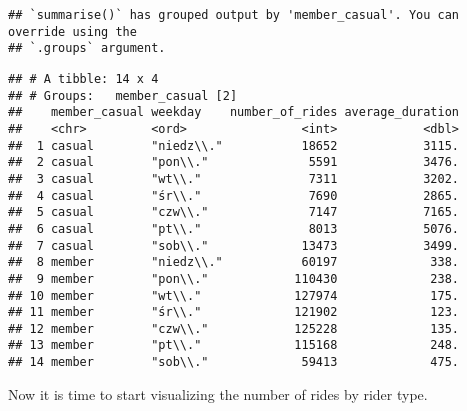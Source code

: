 \documentclass[
]{article}
\begin{document}
\begin{verbatim}
## `summarise()` has grouped output by 'member_casual'. You can override using the
## `.groups` argument.
\end{verbatim}

\begin{verbatim}
## # A tibble: 14 x 4
## # Groups:   member_casual [2]
##    member_casual weekday    number_of_rides average_duration
##    <chr>         <ord>                <int>            <dbl>
##  1 casual        "niedz\\."           18652            3115.
##  2 casual        "pon\\."              5591            3476.
##  3 casual        "wt\\."               7311            3202.
##  4 casual        "śr\\."               7690            2865.
##  5 casual        "czw\\."              7147            7165.
##  6 casual        "pt\\."               8013            5076.
##  7 casual        "sob\\."             13473            3499.
##  8 member        "niedz\\."           60197             338.
##  9 member        "pon\\."            110430             238.
## 10 member        "wt\\."             127974             175.
## 11 member        "śr\\."             121902             123.
## 12 member        "czw\\."            125228             135.
## 13 member        "pt\\."             115168             248.
## 14 member        "sob\\."             59413             475.
\end{verbatim}

Now it is time to start visualizing the number of rides by rider type.
\end{document}
